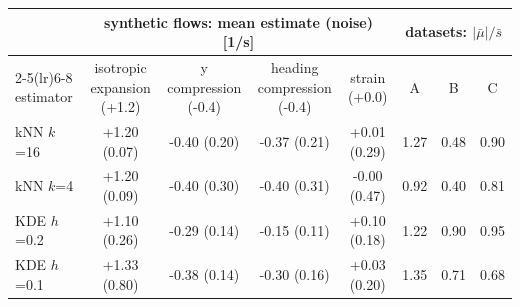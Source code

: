 \begin{tabular}{lccccccc}
\toprule
 & \multicolumn{4}{c}{synthetic flows: mean estimate (noise) [1/s]} & \multicolumn{3}{c}{datasets: $|\bar\mu|/\bar s$} \\
\cmidrule(lr){2-5}\cmidrule(lr){6-8}
estimator & isotropic expansion (+1.2) & y compression (-0.4) & heading compression (-0.4) & strain (+0.0) & A & B & C \\
\midrule
kNN $k$=16 & +1.20 (0.07) & -0.40 (0.20) & -0.37 (0.21) & +0.01 (0.29) & 1.27 & 0.48 & 0.90 \\
kNN $k$=4 & +1.20 (0.09) & -0.40 (0.30) & -0.40 (0.31) & -0.00 (0.47) & 0.92 & 0.40 & 0.81 \\
KDE $h$=0.2 & +1.10 (0.26) & -0.29 (0.14) & -0.15 (0.11) & +0.10 (0.18) & 1.22 & 0.90 & 0.95 \\
KDE $h$=0.1 & +1.33 (0.80) & -0.38 (0.14) & -0.30 (0.16) & +0.03 (0.20) & 1.35 & 0.71 & 0.68 \\
\bottomrule
\end{tabular}
